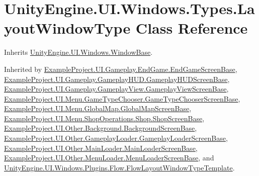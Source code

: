 \hypertarget{class_unity_engine_1_1_u_i_1_1_windows_1_1_types_1_1_layout_window_type}{}\section{Unity\+Engine.\+U\+I.\+Windows.\+Types.\+Layout\+Window\+Type Class Reference}
\label{class_unity_engine_1_1_u_i_1_1_windows_1_1_types_1_1_layout_window_type}


Inherits \hyperlink{class_unity_engine_1_1_u_i_1_1_windows_1_1_window_base}{Unity\+Engine.\+U\+I.\+Windows.\+Window\+Base}.



Inherited by \hyperlink{class_example_project_1_1_u_i_1_1_gameplay_1_1_end_game_1_1_end_game_screen_base}{Example\+Project.\+U\+I.\+Gameplay.\+End\+Game.\+End\+Game\+Screen\+Base}, \hyperlink{class_example_project_1_1_u_i_1_1_gameplay_1_1_gameplay_h_u_d_1_1_gameplay_h_u_d_screen_base}{Example\+Project.\+U\+I.\+Gameplay.\+Gameplay\+H\+U\+D.\+Gameplay\+H\+U\+D\+Screen\+Base}, \hyperlink{class_example_project_1_1_u_i_1_1_gameplay_1_1_gameplay_view_1_1_gameplay_view_screen_base}{Example\+Project.\+U\+I.\+Gameplay.\+Gameplay\+View.\+Gameplay\+View\+Screen\+Base}, \hyperlink{class_example_project_1_1_u_i_1_1_menu_1_1_game_type_chooser_1_1_game_type_chooser_screen_base}{Example\+Project.\+U\+I.\+Menu.\+Game\+Type\+Chooser.\+Game\+Type\+Chooser\+Screen\+Base}, \hyperlink{class_example_project_1_1_u_i_1_1_menu_1_1_global_map_1_1_global_map_screen_base}{Example\+Project.\+U\+I.\+Menu.\+Global\+Map.\+Global\+Map\+Screen\+Base}, \hyperlink{class_example_project_1_1_u_i_1_1_menu_1_1_shop_operations_1_1_shop_1_1_shop_screen_base}{Example\+Project.\+U\+I.\+Menu.\+Shop\+Operations.\+Shop.\+Shop\+Screen\+Base}, \hyperlink{class_example_project_1_1_u_i_1_1_other_1_1_background_1_1_background_screen_base}{Example\+Project.\+U\+I.\+Other.\+Background.\+Background\+Screen\+Base}, \hyperlink{class_example_project_1_1_u_i_1_1_other_1_1_gameplay_loader_1_1_gameplay_loader_screen_base}{Example\+Project.\+U\+I.\+Other.\+Gameplay\+Loader.\+Gameplay\+Loader\+Screen\+Base}, \hyperlink{class_example_project_1_1_u_i_1_1_other_1_1_main_loader_1_1_main_loader_screen_base}{Example\+Project.\+U\+I.\+Other.\+Main\+Loader.\+Main\+Loader\+Screen\+Base}, \hyperlink{class_example_project_1_1_u_i_1_1_other_1_1_menu_loader_1_1_menu_loader_screen_base}{Example\+Project.\+U\+I.\+Other.\+Menu\+Loader.\+Menu\+Loader\+Screen\+Base}, and \hyperlink{class_unity_engine_1_1_u_i_1_1_windows_1_1_plugins_1_1_flow_1_1_flow_layout_window_type_template}{Unity\+Engine.\+U\+I.\+Windows.\+Plugins.\+Flow.\+Flow\+Layout\+Window\+Type\+Template}.

